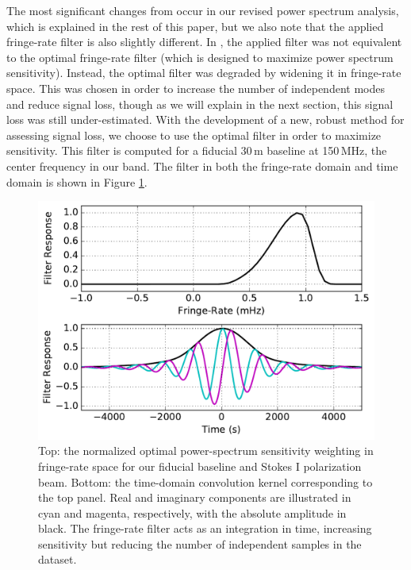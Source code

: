\documentclass[preprint2,numberedappendix,tighten]{aastex6}  %
\begin{document}
The most significant changes from  occur in our revised power spectrum analysis, which is explained in the rest of this paper, but we also note that the applied fringe-rate filter is also slightly different. In , the 
applied filter was not equivalent to the optimal fringe-rate filter (which is designed to maximize power spectrum sensitivity). Instead, the optimal filter was degraded by widening it in fringe-rate space. This was chosen in order to increase the number of independent 
modes and reduce signal loss, though as we will explain in the next section, this signal loss was still under-estimated. With the development of a new, 
robust method for assessing signal loss, we choose to use the optimal filter in order to maximize sensitivity. This filter is 
computed for a fiducial 30\,m baseline at 150\,MHz, the center frequency in our band. The filter in both the fringe-rate 
domain and time domain is shown in Figure \ref{fig:frp}.

\begin{figure}
	\centering
	\includegraphics[width=\columnwidth]{plots/frp.pdf}
	\caption{Top: the normalized optimal power-spectrum sensitivity weighting in fringe-rate space for our fiducial baseline and 
Stokes I polarization beam. Bottom: the time-domain convolution kernel corresponding to the top panel. Real and imaginary 
components are illustrated in cyan and magenta, respectively, with the absolute amplitude in black. The fringe-rate filter acts as 
an integration in time, increasing sensitivity but reducing the number of independent samples in the dataset.}
	\label{fig:frp}
\end{figure}
\end{document}
